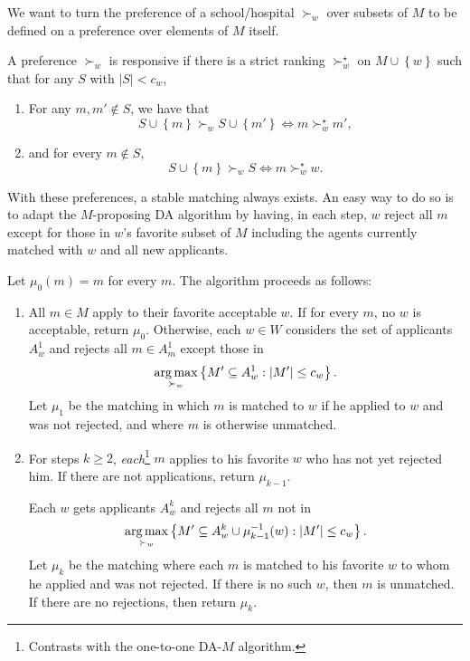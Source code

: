 We want to turn the preference of a school/hospital $\succ_w$ over subsets of $M$ to be defined on a preference over elements of $M$ itself.
\begin{definition}[Responsive]
	A preference $\succ_w$ is responsive if there is a strict ranking $\succ_w^\star$ on $M\cup \left\{w\right\}$ such that for any $S$ with $\left| S \right| < c_w$,
	\begin{enumerate}[label = (\roman*)]
		\item For any $m,m' \not\in S$, we have that \[
			S \cup \left\{m\right\} \succ_w S \cup \left\{m'\right\} \iff m \succ_w^\star m'
		,\] 
		\item and for every $m \not\in S$, \[
			S \cup \left\{m\right\} \succ_w S \iff m \succ_w^\star w
		.\]  
	\end{enumerate}
\end{definition}
With these preferences, a stable matching always exists. An easy way to do so is to adapt the $M$-proposing DA algorithm by having, in each step, $w$ reject all $m$ except for those in $w$'s favorite subset of $M$ including the agents currently matched with $w$ and all new applicants.

\begin{definition}
	Let $\mu_0(m) = m$ for every $m$.
	The algorithm proceeds as follows:
	\begin{enumerate}[label = (\roman*)]
		\item All $m \in M$ apply to their favorite acceptable $w$. If for every $m$, no $w$ is acceptable, return $\mu_0$. Otherwise, each $w \in W$ considers the set of applicants $A_w^{1}$ and rejects all $m \in A_m^{1}$ except those in \[
			\operatorname*{arg\,max}_{\succ_w} \left\{M' \subseteq A_w^{1}: \left| M' \right| \le c_w\right\}
		.\] Let $\mu_1$ be the matching in which $m$ is matched to $w$ if he applied to $w$ and was not rejected, and where $m$ is otherwise unmatched.
		\item For steps $k\ge 2$, \emph{each}\footnote{Contrasts with the one-to-one DA-$M$ algorithm.} $m$ applies to his favorite $w$ who has not yet rejected him. If there are not applications, return $\mu_{k-1}$.

		Each $w$ gets applicants $A_w^{k}$ and rejects all $m$ not in \[
			\operatorname*{arg\,max}_{\succ_w} \left\{M' \subseteq A_w^{k} \cup \mu_{k-1}^{-1}(w): \left| M' \right| \le c_w\right\}
		.\] 
		Let $\mu_k$ be the matching where each $m$ is matched to his favorite $w$ to whom he applied and was not rejected. If there is no such $w$, then $m$ is unmatched.
		If there are no rejections, then return $\mu_k$.
	\end{enumerate}
\end{definition}

